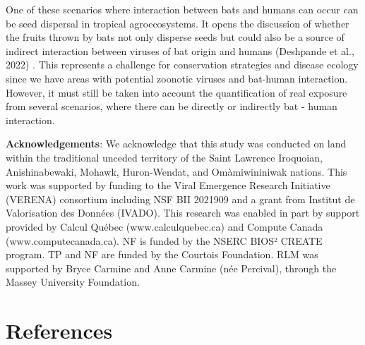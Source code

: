 \documentclass[10pt,oneside]{article}
\begin{document}
One of these scenarios where interaction between bats and humans can
occur can be seed dispersal in tropical agroecosystems. It opens the
discussion of whether the fruits thrown by bats not only disperse seeds
but could also be a source of indirect interaction between viruses of
bat origin and humans (Deshpande et al., 2022) . This represents a
challenge for conservation strategies and disease ecology since we have
areas with potential zoonotic viruses and bat-human interaction.
However, it must still be taken into account the quantification of real
exposure from several scenarios, where there can be directly or
indirectly bat - human interaction.

\textbf{Acknowledgements}: We acknowledge that this study was conducted
on land within the traditional unceded territory of the Saint Lawrence
Iroquoian, Anishinabewaki, Mohawk, Huron-Wendat, and Omàmiwininiwak
nations. This work was supported by funding to the Viral Emergence
Research Initiative (VERENA) consortium including NSF BII 2021909 and a
grant from Institut de Valorisation des Données (IVADO). This research
was enabled in part by support provided by Calcul Québec
(www.calculquebec.ca) and Compute Canada (www.computecanada.ca). NF is
funded by the NSERC BIOS² CREATE program. TP and NF are funded by the
Courtois Foundation. RLM was supported by Bryce Carmine and Anne Carmine
(née Percival), through the Massey University Foundation.

\hypertarget{references}{%
\section*{References}\label{references}}
\end{document}
